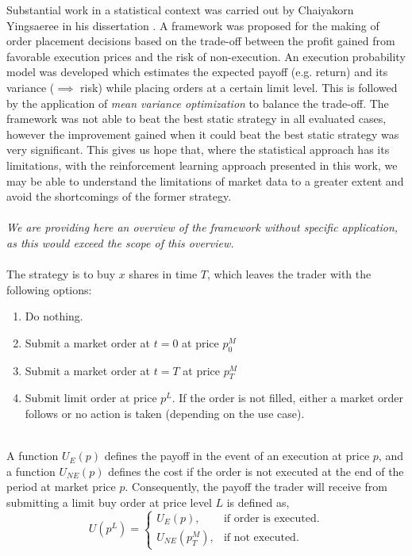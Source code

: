 Substantial work in a statistical context was carried out by Chaiyakorn Yingsaeree in his dissertation \cite{yingsaeree2012algorithmic}.
A framework was proposed for the making of order placement decisions based on the trade-off between the profit gained from favorable execution prices and the risk of non-execution.
An execution probability model was developed which estimates the expected payoff (e.g. return) and its variance ($\implies$ risk) while placing orders at a certain limit level.  This is followed by the application of \textit{mean variance optimization} to balance the trade-off.
The framework was not able to beat the best static strategy in all evaluated cases, however the improvement gained when it could beat the best static strategy was very significant.
This gives us hope that, where the statistical approach has its limitations, with the reinforcement learning approach presented in this work, we may be able to understand the limitations of market data to a greater extent and avoid the shortcomings of the former strategy.
\\
\\
\textit{We are providing here an overview of the framework without specific application, as this would exceed the scope of this overview.}
\\
\\
The strategy is to buy $x$ shares in time $T$, which leaves the trader with the following options:
\begin{enumerate}
    \item Do nothing.
    \item Submit a market order at $t=0$ at price $p_{0}^M$
    \item Submit a market order at $t=T$ at price $p_{T}^M$
    \item Submit limit order at price $p^L$. If the order is not filled, either a market order follows or no action is taken (depending on the use case).
\end{enumerate}
\hfill
\\
A function $U_{E}(p)$ defines the payoff in the event of an execution at price $p$, and a function $U_{NE}(p)$ defines the cost if the order is not executed at the end of the period at market price $p$. 
Consequently, the payoff the trader will receive from submitting a limit buy order at price level $L$ is defined as,
\begin{equation}
    U(p^L) = \begin{cases}
                U_E(p), & \text{if order is executed}.\\
                U_{NE}(p_T^M), & \text{if not executed}.
             \end{cases}
\end{equation}
